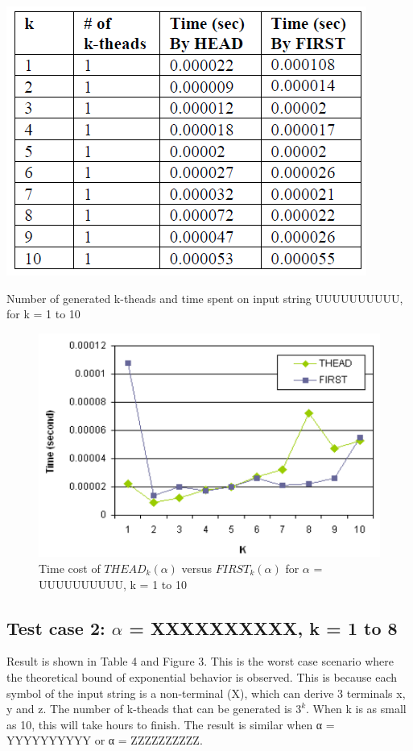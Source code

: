 \documentclass{sig-alternate-05-2015}
\begin{document}
\begin{table}
\centering
\includegraphics[scale=0.5]{table3.PNG}
\caption{Number of generated k-theads and time spent on
input string UUUUUUUUUU, for k = 1 to 10}
\label{table:3}
\end{table}

\begin{figure}
\centering
\includegraphics[scale=0.5]{figure2.PNG}
\caption{Time cost of $THEAD_k(\alpha)$ versus $FIRST_k(\alpha)$
for $\alpha$ = UUUUUUUUUU, k = 1 to 10}
\label{fig:2}
\end{figure}


\subsection{Test case 2: $\alpha$ = XXXXXXXXXX, k = 1 to 8}
Result is shown in Table 4 and Figure 3. This is the worst
case scenario where the theoretical bound of exponential
behavior is observed. This is because each symbol of the
input string is a non-terminal (X), which can derive 3 terminals
x, y and z. The number of k-theads that can be generated
is $3^k$. When k is as small as 10, this will take hours to
finish. The result is similar when α = YYYYYYYYYY or
α = ZZZZZZZZZZ.
\end{document}
